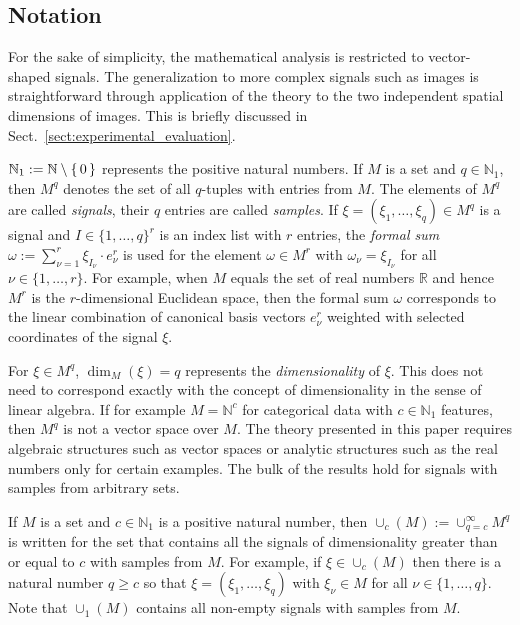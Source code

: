 \documentclass[journal]{IEEEtran}
\newcommand{\N}{\mathbb{N}}
\newcommand{\R}{\mathbb{R}}
\newcommand{\discint}[2]{\{#1,\dotsc,#2\}}
\newcommand{\inint}[2]{\in\discint{#1}{#2}}
\begin{document}
\subsection{Notation}
For the sake of simplicity, the mathematical analysis is restricted to vector-shaped signals.
The generalization to more complex signals such as images is straightforward through application of the theory to the two independent spatial dimensions of images.
This is briefly discussed in Sect.~\ref{sect:experimental_evaluation}.

$\N_1 := \N\setminus\set{0}$ represents the positive natural numbers.
If $M$ is a set and $q\in\N_1$, then $M^q$ denotes the set of all $q$-tuples with entries from $M$.
The elements of $M^q$ are called \emph{signals}, their $q$ entries are called \emph{samples}.
If $\xi = (\xi_1,\dotsc,\xi_q)\in M^q$ is a signal and $I\in\discint{1}{q}^r$ is an index list with $r$ entries, the \emph{formal sum} $\omega := \sum_{\nu = 1}^r \xi_{I_\nu}\cdot e_\nu^r$ is used for the element $\omega\in M^r$ with $\omega_\nu = \xi_{I_\nu}$ for all $\nu\inint{1}{r}$.
For example, when $M$ equals the set of real numbers $\R$ and hence $M^r$ is the $r$-dimensional Euclidean space, then the formal sum $\omega$ corresponds to the linear combination of canonical basis vectors $e_\nu^r$ weighted with selected coordinates of the signal $\xi$.

For $\xi\in M^q$, $\dim_M(\xi) = q$ represents the \emph{dimensionality} of $\xi$.
This does not need to correspond exactly with the concept of dimensionality in the sense of linear algebra.
If for example $M = \N^c$ for categorical data with $c\in\N_1$ features, then $M^q$ is not a vector space over $M$.
The theory presented in this paper requires algebraic structures such as vector spaces or analytic structures such as the real numbers only for certain examples.
The bulk of the results hold for signals with samples from arbitrary sets.

If $M$ is a set and $c\in\N_1$ is a positive natural number, then $\cup_c(M) := \cup_{q = c}^\infty M^q$ is written for the set that contains all the signals of dimensionality greater than or equal to $c$ with samples from $M$.
For example, if $\xi\in\cup_c(M)$ then there is a natural number $q\geq c$ so that $\xi = (\xi_1,\dotsc,\xi_q)$ with $\xi_\nu\in M$ for all $\nu\inint{1}{q}$.
Note that $\cup_1(M)$ contains all non-empty signals with samples from $M$.
\end{document}

